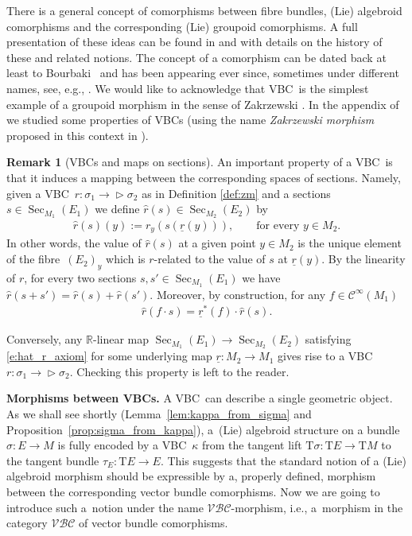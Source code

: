 \documentclass[10pt,a4paper]{amsart}
\newcommand{\ZM}{{VBC}} %
\newcommand{\Zakrzewski}{{vector bundle comorphism}}
\newcommand{\und}{\underline}
\newcommand{\Sec}{\operatorname{Sec}}
\newcommand{\ra}{\rightarrow}
\newcommand{\T}{\mathrm{T}} %
\newcommand{\catZM}{{\mathcal{VBC}}} %
\newcommand{\Cf}{\mathcal{C}^\infty}
\def\relto{\rightarrow\!\!\vartriangleright} %
\numberwithin{equation}{section}
\theoremstyle{definition}
\newtheorem{rem}[thm]{Remark}
\begin{document}
There is a general concept of comorphisms between fibre bundles, (Lie) algebroid comorphisms and the corresponding (Lie) groupoid comorphisms. A full presentation of these ideas can be found in \cite{Cattaneo_Dherin_Weinstein_2012} and \cite{Mackenzie_lie_2005} with details on the history of these and related notions. The concept of a comorphism can be dated back at least to Bourbaki~\cite{Bourbaki_1971} and has been appearing ever since, sometimes under different names, see, e.g., \cite{Guillemin_Sternberg_1977,Higgins_Mackenzie_1990,Huebschmann_1990}. We would like to acknowledge that \ZM\ is the simplest example of a groupoid morphism in the sense of Zakrzewski \cite{Zakrz_quant_class_pseud_I_1990,Zakrz_quant_class_pseud_II_1990}. In the appendix of~\cite{MJ_MR_models_high_alg_2015} we studied some properties of \ZM s (using the name \emph{Zakrzewski morphism} proposed in this context in \cite{GG_var_calc_gen_alg_2008}).

\begin{rem}[\ZM s and maps on sections]\label{rem:zm_sections}
An important property of a \ZM\ is that it induces a mapping between the corresponding spaces of sections. Namely, given a \ZM\ $r\colon \sigma_1 \relto \sigma_2$ as in Definition \ref{def:zm} and a sections $s\in \Sec_{M_1}(E_1)$ we define $\hat{r}(s)\in \Sec_{M_2}(E_2)$ by
\begin{gather*}
\hat{r}(s) (y):= r_y(s(\und{r}(y))),\qquad \text{for every $y\in M_2$.}
\end{gather*}
In other words, the value of $\hat{r}(s)$ at a given point $y\in M_2$ is the unique element of the fibre~$(E_2)_y$ which is $r$-related to the value of $s$ at $\und{r}(y)$.
By the linearity of $r$, for every two sections $s,s'\in \Sec_{M_1}(E_1)$ we have $\hat{r}(s+s')=\hat{r}(s)+\hat{r}(s')$. Moreover, by construction, for any $f\in\Cf(M_1)$
\begin{gather}\label{e:hat_r_axiom}
\hat{r}(f\cdot s) = \und{r}^\ast(f) \cdot \hat{r}(s) .
\end{gather}

Conversely, any ${\mathbb R}$-linear map $\Sec_{M_1}(E_1)\ra \Sec_{M_2}(E_2)$ satisfying \eqref{e:hat_r_axiom} for some underlying map $\und{r}\colon M_2\ra M_1$ gives rise to a \ZM\ $r\colon \sigma_1\relto \sigma_2$. Checking this property is left to the reader.
\end{rem}

{\bf Morphisms between \ZM s.} A \ZM\ can describe a single geometric object. As we shall see shortly (Lemma~\ref{lem:kappa_from_sigma} and Proposition~\ref{prop:sigma_from_kappa}), a~(Lie) algebroid structure on a bundle $\sigma\colon E\ra M$ is fully encoded by a \ZM\ $\kappa$ from the tangent lift $\T\sigma\colon \T E\ra\T M$ to the tangent bundle \mbox{$\tau_E\colon \T E\ra E$}. This suggests that the standard notion of a (Lie) algebroid morphism should be expressible by a, properly defined, morphism between the corresponding \Zakrzewski s. Now we are going to introduce such a~notion under the name $\catZM$-morphism, i.e., a~morphism in the category $\catZM$ of \Zakrzewski s.
\end{document}
